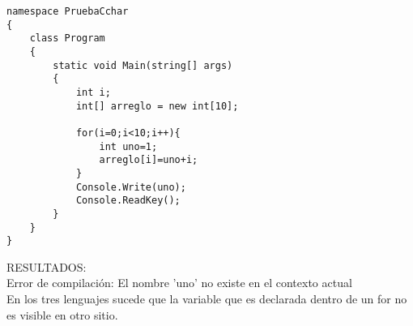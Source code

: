 \lstset{language = C++} 
\begin{lstlisting}[frame = single] %Comienzo del Código
namespace PruebaCchar
{
    class Program
    {
        static void Main(string[] args)
        {
            int i;
            int[] arreglo = new int[10];
	
	        for(i=0;i<10;i++){
		        int uno=1;
		        arreglo[i]=uno+i;
	        }
            Console.Write(uno);
            Console.ReadKey();
        }
    }
}
\end{lstlisting}

RESULTADOS:\\ 
Error de compilación: El nombre 'uno' no existe en el contexto actual\\

En los tres lenguajes sucede que la variable que es declarada dentro de un for no es visible en otro sitio.

